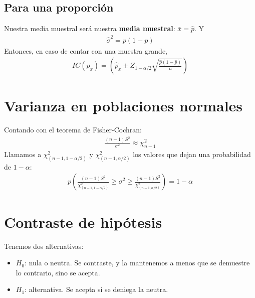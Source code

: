 \documentclass{article}
\begin{document}
\subsection{Para una proporción}
Nuestra media muestral será nuestra \textbf{media muestral}: $\bar{x}=\hat{p}$. Y
\begin{equation}
    \begin{split}
        \hat{\sigma }^{2}= p(1-p)
    \end{split}
\end{equation}
Entonces, en caso de contar con una muestra grande,
\begin{equation}
    \begin{split}
        IC(p_{x}) = (\hat{p}_{x} \pm Z_{1-\alpha / 2} \sqrt{\frac{\hat{p}(1-\hat{p})}{n}})
    \end{split}
\end{equation}
\section{Varianza en poblaciones normales}
Contando con el teorema de Fisher-Cochran:
\begin{equation}
    \begin{split}
        \frac{(n-1)S^{2}}{\sigma^{2}} \approx \chi^{2}_{n-1}
    \end{split}
\end{equation}
Llamamos a $\chi^{2}_{(n-1, 1-\alpha /2)}$ y $\chi^{2}_{(n-1, \alpha /2)}$ los valores que
dejan una probabilidad de $1-\alpha $:
\begin{equation}
    \begin{split}
        p(\frac{(n-1)S^{2}}{\chi^{2}_{(n-1, 1-\alpha /2)}} \geq \sigma^{2} \geq
        \frac{(n-1)S^{2}}{\chi^{2}_{(n-1, \alpha /2)}})=1-\alpha 
    \end{split}
\end{equation}
\section{Contraste de hipótesis}
Tenemos dos alternativas:
\begin{itemize}
    \item $H_{0}$: nula o neutra. Se contraste, y la mantenemos a menos que se demuestre lo
    contrario, sino se acepta.
    \item $H_{1}$: alternativa. Se acepta si se deniega la neutra.
\end{itemize}
\pagebreak
\end{document}
